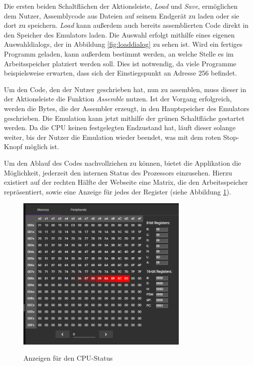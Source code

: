 Die ersten beiden Schaltflächen der Aktionsleiste, \textit{Load} und \textit{Save}, ermöglichen dem Nutzer, Assemblycode aus Dateien auf seinem Endgerät zu laden oder sie dort zu speichern. \textit{Load} kann außerdem auch bereits assemblierten Code direkt in den Speicher des Emulators laden. Die Auswahl erfolgt mithilfe eines eigenen Auswahldialogs, der in Abbildung \ref{fig:loaddialog} zu sehen ist. Wird ein fertiges Programm geladen, kann außerdem bestimmt werden, an welche Stelle es im Arbeitsspeicher platziert werden soll. Dies ist notwendig, da viele Programme beispielsweise erwarten, dass sich der Einstiegspunkt an Adresse 256 befindet.

Um den Code, den der Nutzer geschrieben hat, nun zu assemblen, muss dieser in der Aktionsleiste die Funktion \textit{Assemble} nutzen. Ist der Vorgang erfolgreich, werden die Bytes, die der Assembler erzeugt, in den Hauptspeicher des Emulators geschrieben. Die Emulation kann jetzt mithilfe der grünen Schaltfläche gestartet werden. Da die CPU keinen festgelegten Endzustand hat, läuft dieser solange weiter, bis der Nutzer die Emulation wieder beendet, was mit dem roten Stop-Knopf möglich ist.

Um den Ablauf des Codes nachvollziehen zu können, bietet die Applikation die Möglichkeit, jederzeit den internen Status des Prozessors einzusehen. Hierzu existiert auf der rechten Hälfte der Webseite eine Matrix, die den Arbeitsspeicher repräsentiert, sowie eine Anzeige für jedes der Register (siehe Abbildung \ref{fig:cpustate}).

\begin{figure}
    \caption{Anzeigen für den CPU-Status}
    \centering
    \includegraphics[width=0.75\textwidth]{Bilder/CPUState.png}
    \label{fig:cpustate}
\end{figure}

